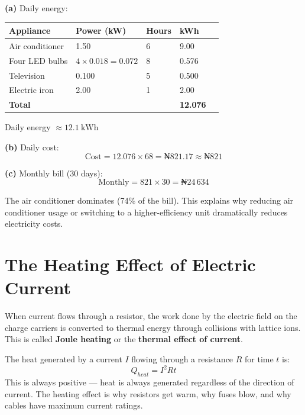 \begin{solutionbox}
\textbf{(a)} Daily energy:

\begin{center}
\begin{tabular}{lllll}
\toprule
Appliance & Power (kW) & Hours & kWh\\
\midrule
Air conditioner & 1.50 & 6 & 9.00\\
Four LED bulbs & $4\times0.018 = 0.072$ & 8 & 0.576\\
Television & 0.100 & 5 & 0.500\\
Electric iron & 2.00 & 1 & 2.00\\
\midrule
\textbf{Total} & & & \textbf{12.076}\\
\bottomrule
\end{tabular}
\end{center}

Daily energy $\approx 12.1\ \text{kWh}$

\textbf{(b)} Daily cost:
\[
  \text{Cost} = 12.076 \times 68
  = ₦821.17 \approx ₦821
\]

\textbf{(c)} Monthly bill (30 days):
\[
  \text{Monthly} = 821 \times 30 = ₦24\,634
\]

The air conditioner dominates (74\% of the bill).
This explains why reducing air conditioner usage
or switching to a higher-efficiency unit dramatically
reduces electricity costs.
\end{solutionbox}

\section{The Heating Effect of Electric Current}

When current flows through a resistor, the work done
by the electric field on the charge carriers is
converted to thermal energy through collisions with
lattice ions. This is called \textbf{Joule heating}
or the \textbf{thermal effect of current}.

\begin{lawbox}
The heat generated by a current $I$ flowing through
a resistance $R$ for time $t$ is:
\[
  Q_{heat} = I^2Rt
\]
This is always positive --- heat is always generated
regardless of the direction of current. The heating
effect is why resistors get warm, why fuses blow,
and why cables have maximum current ratings.
\end{lawbox}

